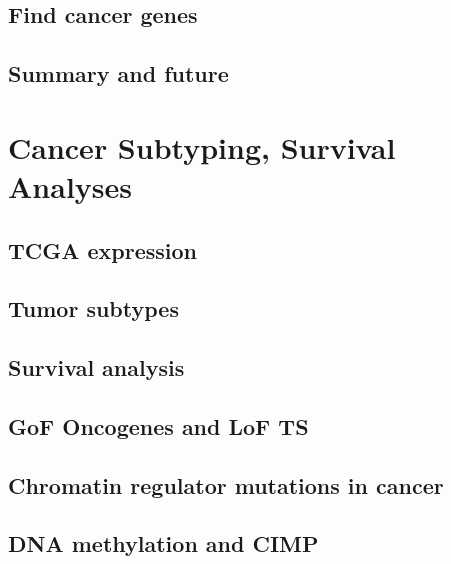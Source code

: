 \documentclass[
]{book}
\begin{document}
\hypertarget{find-cancer-genes}{%
\section{Find cancer genes}\label{find-cancer-genes}}

\hypertarget{summary-and-future}{%
\section{Summary and future}\label{summary-and-future}}

\hypertarget{cancersub}{%
\chapter{Cancer Subtyping, Survival Analyses}\label{cancersub}}

\hypertarget{tcga-expression}{%
\section{TCGA expression}\label{tcga-expression}}

\hypertarget{tumor-subtypes}{%
\section{Tumor subtypes}\label{tumor-subtypes}}

\hypertarget{survival-analysis}{%
\section{Survival analysis}\label{survival-analysis}}

\hypertarget{gof-oncogenes-and-lof-ts}{%
\section{GoF Oncogenes and LoF TS}\label{gof-oncogenes-and-lof-ts}}

\hypertarget{chromatin-regulator-mutations-in-cancer}{%
\section{Chromatin regulator mutations in cancer}\label{chromatin-regulator-mutations-in-cancer}}

\hypertarget{dna-methylation-and-cimp}{%
\section{DNA methylation and CIMP}\label{dna-methylation-and-cimp}}
\end{document}
